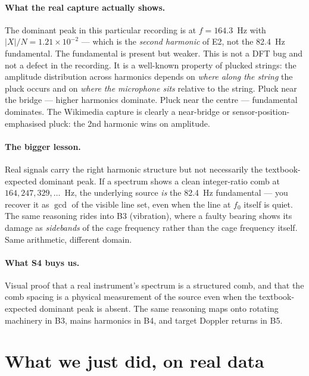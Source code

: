 \documentclass[11pt,a4paper,openany]{book}
\begin{document}
\paragraph{What the real capture actually shows.} The dominant peak
in this particular recording is at $f = 164.3$~Hz with $|X|/N = 1.21
\times 10^{-2}$ --- which is the \emph{second harmonic} of E2, not
the 82.4~Hz fundamental. The fundamental is present but weaker. This
is not a DFT bug and not a defect in the recording. It is a
well-known property of plucked strings: the amplitude distribution
across harmonics depends on \emph{where along the string} the pluck
occurs and on \emph{where the microphone sits} relative to the
string. Pluck near the bridge --- higher harmonics dominate. Pluck
near the centre --- fundamental dominates. The Wikimedia capture is
clearly a near-bridge or sensor-position-emphasised pluck: the 2nd
harmonic wins on amplitude.

\paragraph{The bigger lesson.} Real signals carry the right harmonic
structure but not necessarily the textbook-expected dominant peak.
If a spectrum shows a clean integer-ratio comb at $164, 247, 329,
\ldots$~Hz, the underlying source \emph{is} the 82.4~Hz fundamental
--- you recover it as $\gcd$ of the visible line set, even when the
line at $f_0$ itself is quiet. The same reasoning rides into B3
(vibration), where a faulty bearing shows its damage as
\emph{sidebands} of the cage frequency rather than the cage
frequency itself. Same arithmetic, different domain.

\paragraph{What S4 buys us.} Visual proof that a real instrument's
spectrum is a structured comb, and that the comb spacing is a
physical measurement of the source even when the textbook-expected
dominant peak is absent. The same reasoning maps onto rotating
machinery in B3, mains harmonics in B4, and target Doppler returns
in B5.

\section{What we just did, on real data}
\end{document}
